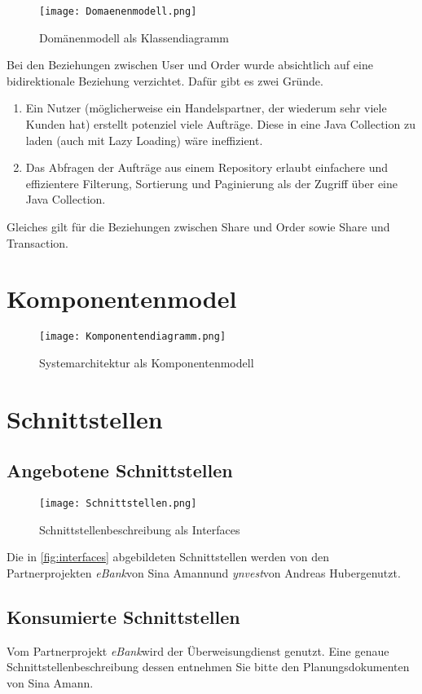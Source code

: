 \documentclass[12pt, a4paper, titlepage]{article}
\newcommand{\andi}[0]{Andreas Huber}
\newcommand{\andiProj}[0]{\textit{ynvest}}
\newcommand{\sina}[0]{Sina Amann}
\newcommand{\sinaProj}[0]{\textit{eBank}}
\begin{document}
\begin{figure}[H]
	\centering
    \texttt{[image: Domaenenmodell.png]}
	\caption{Domänenmodell als Klassendiagramm}
	\label{fig:domain}
\end{figure}

Bei den Beziehungen zwischen User und Order wurde absichtlich auf eine
bidirektionale Beziehung verzichtet. Dafür gibt es zwei Gründe.
\begin{enumerate}
	\item Ein Nutzer (möglicherweise ein Handelspartner, der wiederum sehr
	viele Kunden hat) erstellt potenziel viele Aufträge.
	Diese in eine Java Collection zu laden (auch mit Lazy Loading) wäre
	ineffizient.
	\item Das Abfragen der Aufträge aus einem Repository erlaubt einfachere
	und effizientere Filterung, Sortierung und Paginierung als der Zugriff
	über eine Java Collection.
\end{enumerate}
Gleiches gilt für die Beziehungen zwischen Share und Order sowie Share und
Transaction.

\section{Komponentenmodel}
\begin{figure}[H]
	\centering
    \texttt{[image: Komponentendiagramm.png]}
	\caption{Systemarchitektur als Komponentenmodell}
	\label{fig:components}
\end{figure}

\section{Schnittstellen}

\subsection{Angebotene Schnittstellen}
\label{subsec:Schnittstellen}
\begin{figure}[H]
	\centering
    \texttt{[image: Schnittstellen.png]}
	\caption{Schnittstellenbeschreibung als Interfaces}
	\label{fig:interfaces}
\end{figure}
Die in \autoref{fig:interfaces} abgebildeten Schnittstellen werden von den
Partnerprojekten \sinaProj von \sina und \andiProj von \andi genutzt.

\subsection{Konsumierte Schnittstellen}
Vom Partnerprojekt \sinaProj wird der Überweisungdienst genutzt. Eine genaue
Schnittstellenbeschreibung dessen entnehmen Sie bitte den Planungsdokumenten
von \sina.
\end{document}
